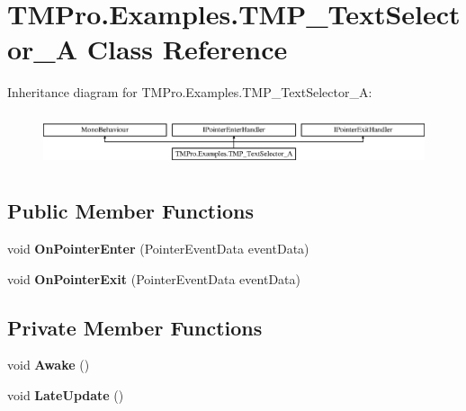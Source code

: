 \hypertarget{class_t_m_pro_1_1_examples_1_1_t_m_p___text_selector___a}{}\section{T\+M\+Pro.\+Examples.\+T\+M\+P\+\_\+\+Text\+Selector\+\_\+A Class Reference}
\label{class_t_m_pro_1_1_examples_1_1_t_m_p___text_selector___a}
Inheritance diagram for T\+M\+Pro.\+Examples.\+T\+M\+P\+\_\+\+Text\+Selector\+\_\+A\+:\begin{figure}[H]
\begin{center}
\leavevmode
\includegraphics[height=1.568627cm]{class_t_m_pro_1_1_examples_1_1_t_m_p___text_selector___a}
\end{center}
\end{figure}
\subsection*{Public Member Functions}
\begin{DoxyCompactItemize}
\item 
\mbox{\label{class_t_m_pro_1_1_examples_1_1_t_m_p___text_selector___a_a41f448ef3c5dd89abfdcb8ded5c46d89}} 
void {\bfseries On\+Pointer\+Enter} (Pointer\+Event\+Data event\+Data)
\item 
\mbox{\label{class_t_m_pro_1_1_examples_1_1_t_m_p___text_selector___a_a5214229e809ada98db644b76cbdf145a}} 
void {\bfseries On\+Pointer\+Exit} (Pointer\+Event\+Data event\+Data)
\end{DoxyCompactItemize}
\subsection*{Private Member Functions}
\begin{DoxyCompactItemize}
\item 
\mbox{\label{class_t_m_pro_1_1_examples_1_1_t_m_p___text_selector___a_a1feb6e51793c22491fa9e239acc44d27}} 
void {\bfseries Awake} ()
\item 
\mbox{\label{class_t_m_pro_1_1_examples_1_1_t_m_p___text_selector___a_ae02247155a02fcb4841c061a94b03c1f}} 
void {\bfseries Late\+Update} ()
\end{DoxyCompactItemize}
